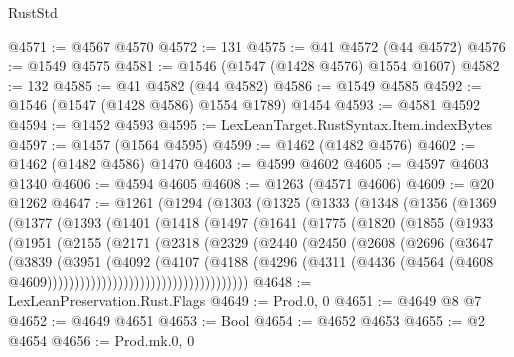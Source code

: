 \begin{lexlean}{RustStd}
\begin{coremodule}
@4571 := @4567 @4570
@4572 := 131
@4575 := @41 @4572 (@44 @4572)
@4576 := @1549 @4575
@4581 := @1546 (@1547 (@1428 @4576) @1554 @1607)
@4582 := 132
@4585 := @41 @4582 (@44 @4582)
@4586 := @1549 @4585
@4592 := @1546 (@1547 (@1428 @4586) @1554 @1789) @1454
@4593 := @4581 @4592
@4594 := @1452 @4593
@4595 := LexLeanTarget.RustSyntax.Item.indexBytes
@4597 := @1457 (@1564 @4595)
@4599 := @1462 (@1482 @4576)
@4602 := @1462 (@1482 @4586) @1470
@4603 := @4599 @4602
@4605 := @4597 @4603 @1340
@4606 := @4594 @4605
@4608 := @1263 (@4571 @4606)
@4609 := @20 @1262
@4647 := @1261
    (@1294
      (@1303
        (@1325
          (@1333
            (@1348
              (@1356
                (@1369
                  (@1377
                    (@1393
                      (@1401
                        (@1418
                          (@1497
                            (@1641
                              (@1775
                                (@1820
                                  (@1855
                                    (@1933
                                      (@1951
                                        (@2155
                                          (@2171
                                            (@2318
                                              (@2329
                                                (@2440
                                                  (@2450
                                                    (@2608
                                                      (@2696
                                                        (@3647
                                                          (@3839
                                                            (@3951
                                                              (@4092
                                                                (@4107
                                                                  (@4188
                                                                    (@4296
                                                                      (@4311
                                                                        (@4436
                                                                          (@4564
                                                                            (@4608
                                                                              @4609)))))))))))))))))))))))))))))))))))))
@4648 := LexLeanPreservation.Rust.Flags
@4649 := Prod.{0, 0}
@4651 := @4649 @8 @7
@4652 := @4649 @4651
@4653 := Bool
@4654 := @4652 @4653
@4655 := @2 @4654
@4656 := Prod.mk.{0, 0}

\end{coremodule}
\end{lexlean}
